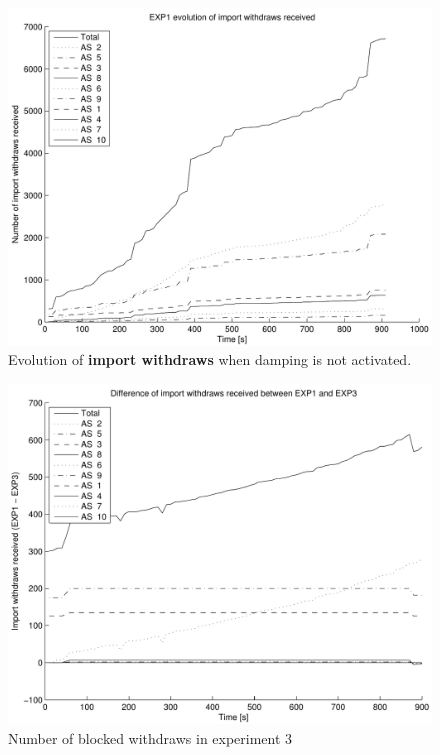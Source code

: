 \documentclass[a4paper,english]{IEEEtran}
\begin{document}
\begin{figure}
\begin{center}
\includegraphics[scale=.5]{img/exp1_withdraws.pdf}
\end{center}
\caption{Evolution of \textbf{import withdraws} when damping is not activated.}
\label{fig_exp1_withdraws}
\end{figure}

\begin{figure}
\begin{center}
\includegraphics[scale=.5]{img/diff_exp1_exp3_withdraws.pdf}
\end{center}
\caption{Number of blocked withdraws in experiment 3}
\label{fig_diff_withdraws}
\end{figure}
\end{document}
